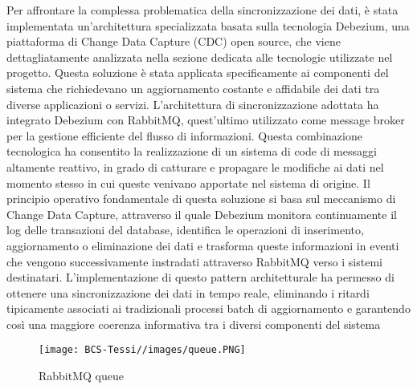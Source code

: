 Per affrontare la complessa problematica della sincronizzazione dei dati, è stata implementata un'architettura specializzata basata sulla tecnologia Debezium, una piattaforma di Change Data Capture (CDC) open source, che viene dettagliatamente analizzata nella sezione dedicata alle tecnologie utilizzate nel progetto. Questa soluzione è stata applicata specificamente ai componenti del sistema che richiedevano un aggiornamento costante e affidabile dei dati tra diverse applicazioni o servizi.
L'architettura di sincronizzazione adottata ha integrato Debezium con RabbitMQ, quest'ultimo utilizzato come message broker per la gestione efficiente del flusso di informazioni. Questa combinazione tecnologica ha consentito la realizzazione di un sistema di code di messaggi altamente reattivo, in grado di catturare e propagare le modifiche ai dati nel momento stesso in cui queste venivano apportate nel sistema di origine.
Il principio operativo fondamentale di questa soluzione si basa sul meccanismo di Change Data Capture, attraverso il quale Debezium monitora continuamente il log delle transazioni del database, identifica le operazioni di inserimento, aggiornamento o eliminazione dei dati e trasforma queste informazioni in eventi che vengono successivamente instradati attraverso RabbitMQ verso i sistemi destinatari.
L'implementazione di questo pattern architetturale ha permesso di ottenere una sincronizzazione dei dati in tempo reale, eliminando i ritardi tipicamente associati ai tradizionali processi batch di aggiornamento e garantendo così una maggiore coerenza informativa tra i diversi componenti del sistema

\begin{figure}[H]
    \centering
    \texttt{[image: BCS-Tessi//images/queue.PNG]}
    \caption{RabbitMQ queue}
    \label{fig:queue}
\end{figure}

        
